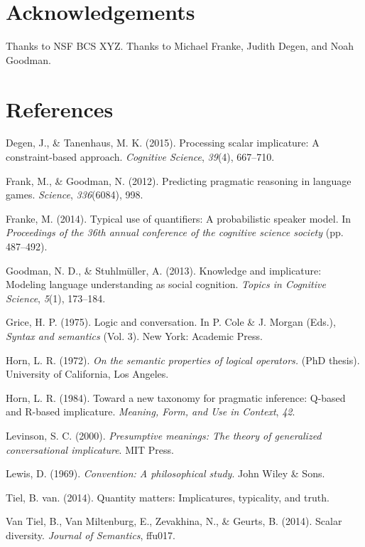 \documentclass[10pt, letterpaper]{article}
\begin{document}
\section{Acknowledgements}\label{acknowledgements}

Thanks to NSF BCS XYZ. Thanks to Michael Franke, Judith Degen, and Noah
Goodman.

\section{References}\label{references}

\setlength{\parindent}{-0.1in} \setlength{\leftskip}{0.125in} \noindent

Degen, J., \& Tanenhaus, M. K. (2015). Processing scalar implicature: A
constraint-based approach. \emph{Cognitive Science}, \emph{39}(4),
667--710.

Frank, M., \& Goodman, N. (2012). Predicting pragmatic reasoning in
language games. \emph{Science}, \emph{336}(6084), 998.

Franke, M. (2014). Typical use of quantifiers: A probabilistic speaker
model. In \emph{Proceedings of the 36th annual conference of the
cognitive science society} (pp. 487--492).

Goodman, N. D., \& Stuhlm{ü}ller, A. (2013). Knowledge and implicature:
Modeling language understanding as social cognition. \emph{Topics in
Cognitive Science}, \emph{5}(1), 173--184.

Grice, H. P. (1975). Logic and conversation. In P. Cole \& J. Morgan
(Eds.), \emph{Syntax and semantics} (Vol. 3). New York: Academic Press.

Horn, L. R. (1972). \emph{On the semantic properties of logical
operators.} (PhD thesis). University of California, Los Angeles.

Horn, L. R. (1984). Toward a new taxonomy for pragmatic inference:
Q-based and R-based implicature. \emph{Meaning, Form, and Use in
Context}, \emph{42}.

Levinson, S. C. (2000). \emph{Presumptive meanings: The theory of
generalized conversational implicature}. MIT Press.

Lewis, D. (1969). \emph{Convention: A philosophical study}. John Wiley
\& Sons.

Tiel, B. van. (2014). Quantity matters: Implicatures, typicality, and
truth.

Van Tiel, B., Van Miltenburg, E., Zevakhina, N., \& Geurts, B. (2014).
Scalar diversity. \emph{Journal of Semantics}, ffu017.
\end{document}
